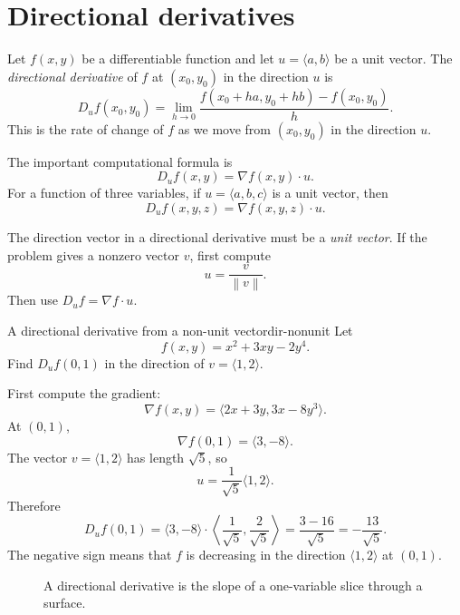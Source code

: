 \documentclass[11pt]{article}
\newcommand{\grad}{\nabla}
\newcommand{\norm}[1]{\left\lVert #1\right\rVert}
\begin{document}
\section{Directional derivatives}

Let $f(x,y)$ be a differentiable function and let $u=\langle a,b\rangle$ be a unit vector. The \emph{directional derivative} of $f$ at $(x_0,y_0)$ in the direction $u$ is
\[
D_u f(x_0,y_0)=\lim_{h\to 0}\frac{f(x_0+ha,y_0+hb)-f(x_0,y_0)}{h}.
\]
This is the rate of change of $f$ as we move from $(x_0,y_0)$ in the direction $u$.

The important computational formula is
\[
D_u f(x,y)=\grad f(x,y)\cdot u.
\]
For a function of three variables, if $u=\langle a,b,c\rangle$ is a unit vector, then
\[
D_u f(x,y,z)=\grad f(x,y,z)\cdot u.
\]

\begin{notebox}
The direction vector in a directional derivative must be a \emph{unit vector}. If the problem gives a nonzero vector $v$, first compute
\[
u=\frac{v}{\norm{v}}.
\]
Then use $D_u f=\grad f\cdot u$.
\end{notebox}

\begin{workedexample}{A directional derivative from a non-unit vector}{dir-nonunit}
Let
\[
f(x,y)=x^2+3xy-2y^4.
\]
Find $D_u f(0,1)$ in the direction of $v=\langle 1,2\rangle$.

First compute the gradient:
\[
\grad f(x,y)=\langle 2x+3y,3x-8y^3\rangle.
\]
At $(0,1)$,
\[
\grad f(0,1)=\langle 3,-8\rangle.
\]
The vector $v=\langle 1,2\rangle$ has length $\sqrt5$, so
\[
u=\frac{1}{\sqrt5}\langle 1,2\rangle.
\]
Therefore
\[
D_u f(0,1)=\langle 3,-8\rangle\cdot \left\langle \frac{1}{\sqrt5},\frac{2}{\sqrt5}\right\rangle
=\frac{3-16}{\sqrt5}=-\frac{13}{\sqrt5}.
\]
The negative sign means that $f$ is decreasing in the direction $\langle 1,2\rangle$ at $(0,1)$.
\end{workedexample}

\begin{figure}[H]
\centering
{}
\caption{A directional derivative is the slope of a one-variable slice through a surface.}
\end{figure}
\end{document}
